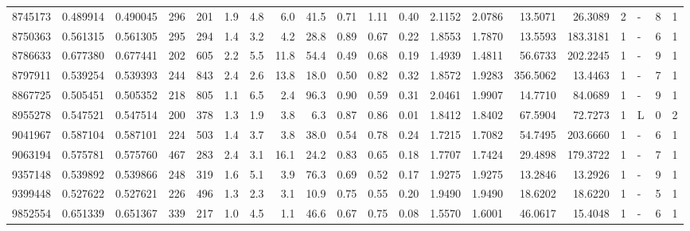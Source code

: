 \begin{tabular}{rrrrrrrrrrrrrrrrrlrl}
   8745173 & 0.489914 & 0.490045 &  296 &  201 &      1.9 &      4.8 &     6.0 &    41.5 &   0.71 &   1.11 &       0.40 &  2.1152 &  2.0786 &   13.5071 &   26.3089 &       2 &             - &        8 &         1 \\
   8750363 & 0.561315 & 0.561305 &  295 &  294 &      1.4 &      3.2 &     4.2 &    28.8 &   0.89 &   0.67 &       0.22 &  1.8553 &  1.7870 &   13.5593 &  183.3181 &       1 &             - &        6 &         1 \\
   8786633 & 0.677380 & 0.677441 &  202 &  605 &      2.2 &      5.5 &    11.8 &    54.4 &   0.49 &   0.68 &       0.19 &  1.4939 &  1.4811 &   56.6733 &  202.2245 &       1 &             - &        9 &         1 \\
   8797911 & 0.539254 & 0.539393 &  244 &  843 &      2.4 &      2.6 &    13.8 &    18.0 &   0.50 &   0.82 &       0.32 &  1.8572 &  1.9283 &  356.5062 &   13.4463 &       1 &             - &        7 &         1 \\
   8867725 & 0.505451 & 0.505352 &  218 &  805 &      1.1 &      6.5 &     2.4 &    96.3 &   0.90 &   0.59 &       0.31 &  2.0461 &  1.9907 &   14.7710 &   84.0689 &       1 &             - &        9 &         1 \\
   8955278 & 0.547521 & 0.547514 &  200 &  378 &      1.3 &      1.9 &     3.8 &     6.3 &   0.87 &   0.86 &       0.01 &  1.8412 &  1.8402 &   67.5904 &   72.7273 &       1 &             L &        0 &         2 \\
   9041967 & 0.587104 & 0.587101 &  224 &  503 &      1.4 &      3.7 &     3.8 &    38.0 &   0.54 &   0.78 &       0.24 &  1.7215 &  1.7082 &   54.7495 &  203.6660 &       1 &             - &        6 &         1 \\
   9063194 & 0.575781 & 0.575760 &  467 &  283 &      2.4 &      3.1 &    16.1 &    24.2 &   0.83 &   0.65 &       0.18 &  1.7707 &  1.7424 &   29.4898 &  179.3722 &       1 &             - &        7 &         1 \\
   9357148 & 0.539892 & 0.539866 &  248 &  319 &      1.6 &      5.1 &     3.9 &    76.3 &   0.69 &   0.52 &       0.17 &  1.9275 &  1.9275 &   13.2846 &   13.2926 &       1 &             - &        9 &         1 \\
   9399448 & 0.527622 & 0.527621 &  226 &  496 &      1.3 &      2.3 &     3.1 &    10.9 &   0.75 &   0.55 &       0.20 &  1.9490 &  1.9490 &   18.6202 &   18.6220 &       1 &             - &        5 &         1 \\
   9852554 & 0.651339 & 0.651367 &  339 &  217 &      1.0 &      4.5 &     1.1 &    46.6 &   0.67 &   0.75 &       0.08 &  1.5570 &  1.6001 &   46.0617 &   15.4048 &       1 &             - &        6 &         1 \\

\end{tabular}
